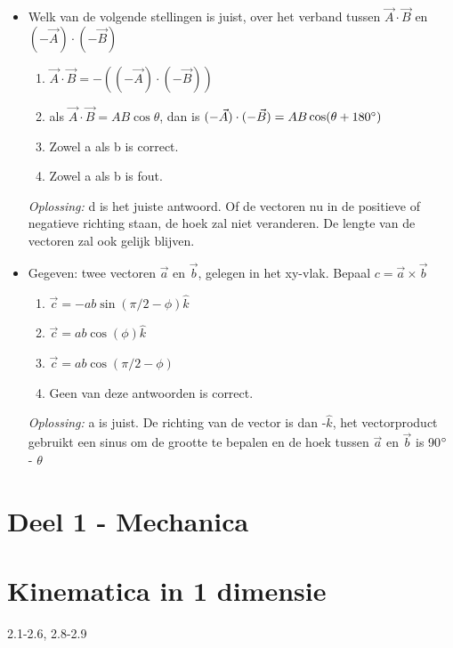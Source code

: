 \documentclass[12pt,a4paper]{article}
\begin{document}
\begin{itemize}
        \item Welk van de volgende stellingen is juist, over het verband tussen \(\vec{A} \cdot \vec{B}\) en \((-\vec{A}) \cdot (-\vec{B})\)
        \begin{enumerate}
            [label=\alph*)]
            \item \(\vec{A} \cdot \vec{B} = -((-\vec{A})\cdot(-\vec{B}))\)
            \item als \(\vec{A} \cdot \vec{B} = AB\cos\theta \), dan is \((-\vec{A}) \cdot (-\vec{B}) = AB\cos(\theta + 180\degree)\)
            \item Zowel a als b is correct.
            \item Zowel a als b is fout.
        \end{enumerate}
        \textit{Oplossing:} d is het juiste antwoord.
        Of de vectoren nu in de positieve of negatieve richting staan, de hoek zal niet veranderen.
        De lengte van de vectoren zal ook gelijk blijven.

        \item Gegeven: twee vectoren $\vec{a}$ en $\vec{b}$, gelegen in het xy-vlak.
        Bepaal \(c = \vec{a} \times \vec{b}\)
        \begin{enumerate}
            [label=\alph*)]
            \item \(\vec{c} = - ab \sin(\pi/2 - \phi)\hat{k}\)
            \item \(\vec{c} = ab \cos(\phi)\hat{k}\)
            \item \(\vec{c} = ab \cos(\pi/2 - \phi)\)
            \item Geen van deze antwoorden is correct.
        \end{enumerate}
        \textit{Oplossing:} a is juist. De richting van de vector is dan -$\hat{k}$, het vectorproduct gebruikt een sinus om de grootte te bepalen en de hoek tussen $\vec{a}$ en $\vec{b}$ is 90$\degree$ - $\theta$
    \end{itemize}


    \section{Deel 1 - Mechanica}


    \section{Kinematica in 1 dimensie}
    2.1-2.6, 2.8-2.9
\end{document}
